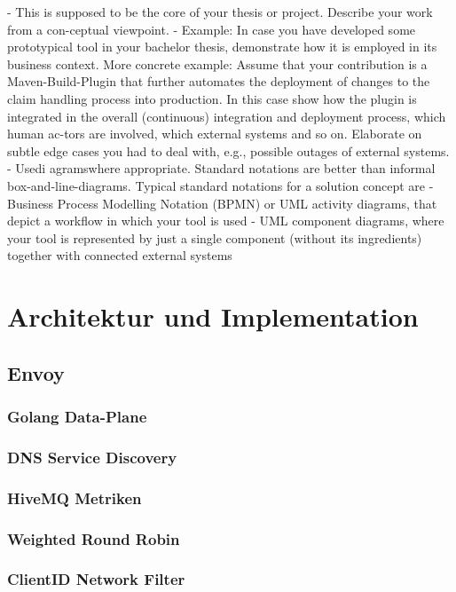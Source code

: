- This is supposed to be the core of your thesis or project. Describe your work from a con-ceptual viewpoint.
- Example: In case you have developed some prototypical tool in your bachelor thesis, demonstrate how it is employed in its business context. More concrete example: Assume that your contribution is a Maven-Build-Plugin that further automates the deployment of changes to the claim handling process into production. In this case show how the plugin is integrated in the overall (continuous) integration and deployment process, which human ac-tors are involved, which external systems and so on. Elaborate on subtle edge cases you had to deal with, e.g., possible outages of external systems.
- Usedi  agramswhere appropriate. Standard notations are better than informal box-and-line-diagrams. Typical standard notations for a solution concept are
  - Business Process Modelling Notation (BPMN) or UML activity diagrams, that depict a workflow in which your tool is used
  - UML component diagrams, where your tool is represented by just a single component (without its ingredients) together with connected external systems

\section{Architektur und Implementation}

\subsection{Envoy}
\subsubsection{Golang Data-Plane}
\subsubsection{DNS Service Discovery}
\subsubsection{HiveMQ Metriken}
\subsubsection{Weighted Round Robin}
\subsubsection{ClientID Network Filter}

